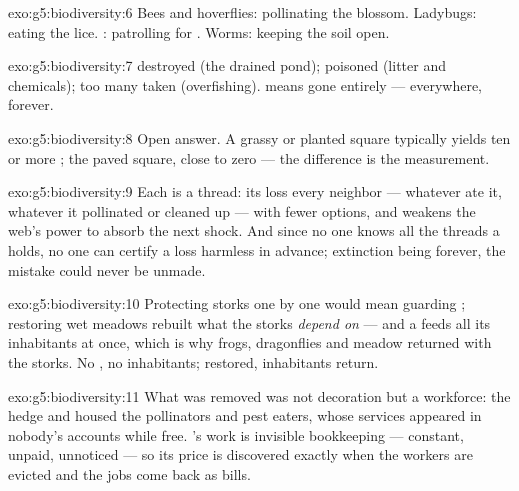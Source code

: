 \begin{solution}{exo:g5:biodiversity:6}
Bees and hoverflies: pollinating the blossom. Ladybugs:
eating the  lice. : patrolling for .
Worms: keeping the soil open.
\end{solution}

\begin{solution}{exo:g5:biodiversity:7}
 destroyed (the drained pond);  poisoned
(litter and chemicals); too many taken (overfishing). 
means gone entirely --- everywhere, forever.
\end{solution}

\begin{solution}{exo:g5:biodiversity:8}
Open answer. A grassy or planted square typically yields ten
or more ; the paved square, close to zero --- the
difference is the measurement.
\end{solution}

\begin{solution}{exo:g5:biodiversity:9}
Each  is a thread: its loss  every neighbor ---
whatever ate it, whatever it pollinated or cleaned up ---
with fewer options, and weakens the web's power to absorb
the next shock. And since no one knows all the threads a
 holds, no one can certify a loss harmless in
advance; extinction being forever, the mistake could never
be unmade.
\end{solution}

\begin{solution}{exo:g5:biodiversity:10}
Protecting storks one by one would mean guarding ;
restoring wet meadows rebuilt what the storks \emph{depend
on} --- and a  feeds all its inhabitants at once,
which is why frogs, dragonflies and meadow  returned
with the storks. No , no inhabitants; 
restored, inhabitants return.
\end{solution}

\begin{solution}{exo:g5:biodiversity:11}
What was removed was not decoration but a workforce: the
hedge and   housed the pollinators and pest
eaters, whose services appeared in nobody's accounts while
free. 's work is invisible bookkeeping --- constant,
unpaid, unnoticed --- so its price is discovered exactly
when the workers are evicted and the jobs come back as
bills.
\end{solution}
